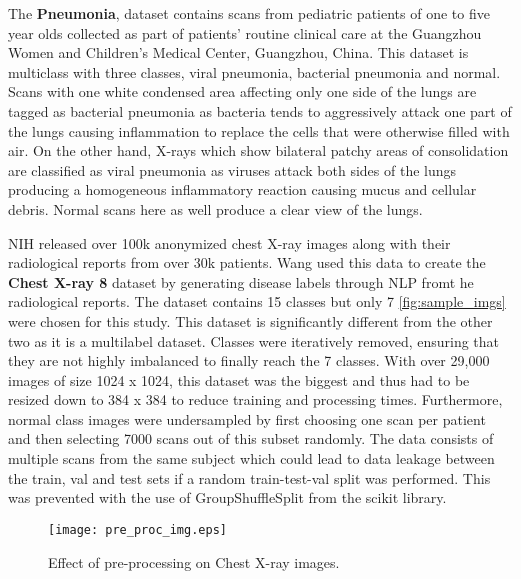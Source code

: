 \documentclass[10pt,twocolumn,letterpaper]{article}
\begin{document}
The \textbf{Pneumonia}, dataset contains scans from pediatric patients of one to five year olds 
collected as part of patients' routine clinical care at the Guangzhou Women and Children's 
Medical Center, Guangzhou, China. \cite{kermany2018labeled,kagglepneu} 
This dataset is multiclass with three classes, viral pneumonia, bacterial pneumonia and normal.
Scans with one white condensed area affecting only one 
side of the lungs are tagged as bacterial pneumonia\cite{areviral} as bacteria tends to 
aggressively attack one part of the lungs causing inflammation to replace the cells 
that were otherwise filled with air. On the other hand, X-rays which 
show bilateral patchy areas of consolidation are classified as viral pneumonia
\cite{guo2012radiological} as viruses attack both sides of the lungs producing a 
homogeneous inflammatory reaction causing mucus and cellular debris. Normal scans here as well 
produce a clear view of the lungs. 

NIH \cite{chestxray2017data} released over 100k anonymized chest X-ray images along with 
their radiological reports from over 30k patients. Wang \etal \cite{wang2017chestx} 
used this data to create the \textbf{Chest X-ray 8} dataset by generating disease labels 
through NLP fromt he radiological reports. \cite{kaggle8} The dataset contains 15 classes but only 
7 \cref{fig:sample_imgs} were chosen for this study. This dataset is significantly different from the 
other two as it is a multilabel dataset. Classes were iteratively removed, ensuring that
they are not highly imbalanced to finally reach the 7 classes. With over 29,000 images of size 
1024 x 1024, this dataset was the biggest and thus had to be resized down to 384 x 384 to 
reduce training and processing times. Furthermore, normal class images were undersampled by first
choosing one scan per patient and then selecting 7000 scans out of this subset randomly. 
The data consists of multiple scans from the same subject which could lead to data leakage between 
the train, val and test sets if a random train-test-val split was performed. 
This was prevented with the use of GroupShuffleSplit from the scikit library. 

\begin{figure}[t]
  \centering
  \texttt{[image: pre\_proc\_img.eps]}  
   \caption{Effect of pre-processing on Chest X-ray images.}
   \label{fig:pre_proc_img}
\end{figure}
\end{document}
